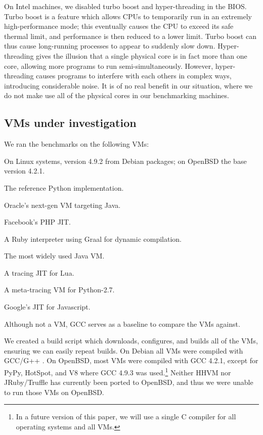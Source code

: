 \documentclass[10pt,preprint]{sigplanconf}
\begin{document}
On Intel machines, we disabled turbo boost and hyper-threading in the BIOS. Turbo boost is a
feature which allows CPUs to temporarily run in an extremely high-performance
mode; this eventually causes the CPU to exceed its safe thermal limit, and
performance is then reduced to a lower limit. Turbo boost can thus cause long-running processes to
appear to suddenly slow down. Hyper-threading gives the illusion that a single
physical core is in fact more than one core, allowing more programs to
run semi-simultaneously. However, hyper-threading causes programs to interfere
with each others in complex ways, introducing considerable noise. It
is of no real benefit in our situation, where we do not make use all of the
physical cores in our benchmarking machines.


\subsection{VMs under investigation}

We ran the benchmarks on the following VMs:
\begin{description*}
\item[GCC] On Linux systems, version 4.9.2 from Debian packages; on OpenBSD the base version 4.2.1.
\item[CPython 2.7.10] The reference Python implementation.
\item[Graal \#9dafd1dc5ff9] Oracle's next-gen VM targeting Java.
\item[HHVM 3.7.1] Facebook's PHP JIT.
\item[JRuby/Truffle \#7f4cd59cdd1c8] A Ruby interpreter using Graal for dynamic compilation.
\item[HotSpot 8u45b14] The most widely used Java VM.
\item[LuaJIT 2.0.4] A tracing JIT for Lua.
\item[PyPy 4.0.0] A meta-tracing VM for Python-2.7.
\item[V8 4.8.271.9] Google's JIT for Javascript.
\end{description*}
Although not a VM, GCC serves as a baseline to compare the VMs against.

We created a build script which downloads, configures, and builds all of the
VMs, ensuring we can easily repeat builds.
On Debian all VMs were compiled with GCC/G++ . On OpenBSD,
most VMs were compiled with GCC 4.2.1, except for PyPy, HotSpot, and V8 where
GCC 4.9.3 was used.\footnote{In a future version of this paper, we will use a
single C compiler for all operating systems and all VMs.} Neither HHVM nor
JRuby/Truffle has currently been ported to OpenBSD, and thus we were unable to
run those VMs on OpenBSD.
\end{document}
